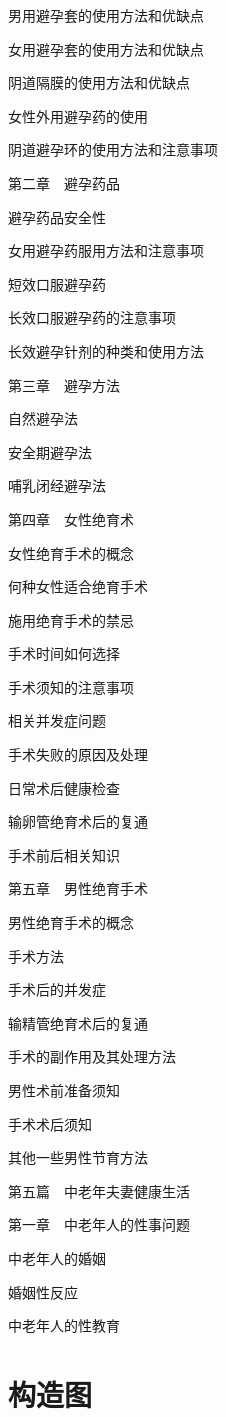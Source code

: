 \documentclass[12pt,UTF8]{ctexbook}
\begin{document}
男用避孕套的使用方法和优缺点

女用避孕套的使用方法和优缺点

阴道隔膜的使用方法和优缺点

女性外用避孕药的使用

阴道避孕环的使用方法和注意事项

第二章　避孕药品

避孕药品安全性

女用避孕药服用方法和注意事项

短效口服避孕药

长效口服避孕药的注意事项

长效避孕针剂的种类和使用方法

第三章　避孕方法

自然避孕法

安全期避孕法

哺乳闭经避孕法

第四章　女性绝育术

女性绝育手术的概念

何种女性适合绝育手术

施用绝育手术的禁忌

手术时间如何选择

手术须知的注意事项

相关并发症问题

手术失败的原因及处理

日常术后健康检查

输卵管绝育术后的复通

手术前后相关知识

第五章　男性绝育手术

男性绝育手术的概念

手术方法

手术后的并发症

输精管绝育术后的复通

手术的副作用及其处理方法

男性术前准备须知

手术术后须知

其他一些男性节育方法

第五篇　中老年夫妻健康生活

第一章　中老年人的性事问题

中老年人的婚姻

婚姻性反应

中老年人的性教育


\chapter{构造图}
\end{document}
